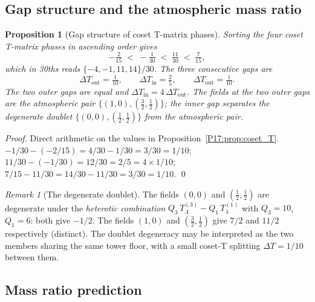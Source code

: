 \documentclass[11pt,a4paper]{article}
\newtheorem{proposition}[theorem]{Proposition}
\theoremstyle{definition}\newtheorem{definition}[theorem]{Definition}
\theoremstyle{remark}
\newtheorem{remark}[theorem]{Remark}
\begin{document}
\subsection{Gap structure and the atmospheric mass ratio}
\label{P17:sec:coset_gaps}

\begin{proposition}[Gap structure of coset T-matrix phases]
\label{P17:prop:coset_gaps}
Sorting the four coset T-matrix phases in ascending order gives
\begin{equation}
  -\tfrac{2}{15} \;<\; -\tfrac{1}{30} \;<\; \tfrac{11}{30} \;<\; \tfrac{7}{15},
  \label{P17:eq:Tsorted}
\end{equation}
which in 30ths reads $\{-4,-1,11,14\}/30$.  The three consecutive
gaps are
\begin{equation}
  \Delta T_{\mathrm{out}} = \tfrac{1}{10}, \qquad
  \Delta T_{\mathrm{in}} = \tfrac{2}{5}, \qquad
  \Delta T_{\mathrm{out}} = \tfrac{1}{10}.
  \label{P17:eq:gaps}
\end{equation}
The two outer gaps are equal and $\Delta T_{\mathrm{in}}=4\,\Delta
T_{\mathrm{out}}$.  The fields at the two outer gaps are the
atmospheric pair $\{(1,0),({\textstyle\frac{3}{2}},{\textstyle\frac{1}{2}})\}$;
the inner gap separates the degenerate doublet
$\{(0,0),({\textstyle\frac{1}{2}},{\textstyle\frac{1}{2}})\}$ from the
atmospheric pair.
\end{proposition}

\begin{proof}
Direct arithmetic on the values in Proposition~\ref{P17:prop:coset_T}.
$-1/30-(-2/15)=4/30-1/30=3/30=1/10$;
$11/30-(-1/30)=12/30=2/5=4\times1/10$;
$7/15-11/30=14/30-11/30=3/30=1/10$.
\qed
\end{proof}

\begin{remark}[The degenerate doublet]
\label{P17:rem:degenerate_doublet}
The fields $(0,0)$ and $(\frac{1}{2},\frac{1}{2})$ are degenerate
under the \emph{heterotic combination}
$Q_3\,T^{(3)}_\Lambda - Q_1\,T^{(1)}_\lambda$ with
$Q_3=10$, $Q_1=6$: both give $-1/2$.  The fields
$(1,0)$ and $(\frac{3}{2},\frac{1}{2})$ give $7/2$ and $11/2$
respectively (distinct).  The doublet degeneracy may be interpreted
as the two members sharing the same tower floor, with a small
coset-T splitting $\Delta T=1/10$ between them.
\end{remark}

\subsection{Mass ratio prediction}
\label{P17:sec:coset_masses}
\end{document}

